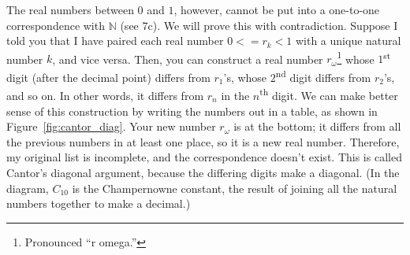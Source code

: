 \documentclass[../gatm.tex]{subfiles}
\begin{document}
The real numbers between $0$ and $1$, however, cannot be put into a one-to-one correspondence with $\mathbb{N}$ (see 7c). We will prove this with contradiction. Suppose I told you that I have paired each real number $0 <= r_k < 1$ with a unique natural number $k$, and vice versa. Then, you can construct a real number $r_\omega$\footnote{Pronounced ``r omega.''} whose $1$\textsuperscript{st} digit (after the decimal point) differs from $r_1$’s, whose $2$\textsuperscript{nd} digit differs from $r_2$’s, and so on. In other words, it differs from $r_n$ in the $n$\textsuperscript{th} digit. We can make better sense of this construction by writing the numbers out in a table, as shown in Figure~\ref{fig:cantor_diag}. Your new number $r_\omega$ is at the bottom; it differs from all the previous numbers in at least one place, so it is a new real number. Therefore, my original list is incomplete, and the correspondence doesn’t exist. This is called Cantor’s diagonal argument, because the differing digits make a diagonal. (In the diagram, $C_10$ is the Champernowne constant, the result of joining all the natural numbers together to make a decimal.) %

\newcommand{\corr}[3] {$\cancelto{#3}{\frac{#1}{#2}}$}
\newcommand{\tcg}[1] {\textcolor{gray}{$#1$}}
\end{document}
